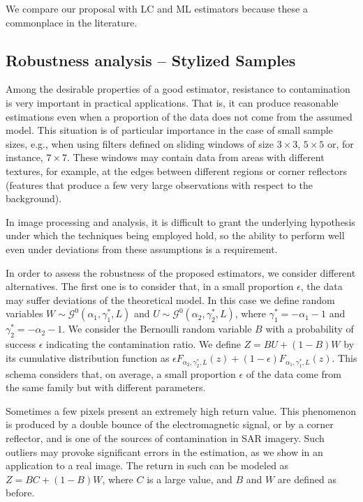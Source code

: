 \documentclass[twocolumn]{svjour3}
\begin{document}
We compare our proposal with LC and ML estimators because these a commonplace in the literature.

\subsection{Robustness analysis -- Stylized Samples}
\label{robustez}
Among the desirable properties of a good estimator, resistance to contamination is very important in practical applications. 
That is, it can produce reasonable estimations even when a proportion of the data does not come from the assumed model. 
This situation is of particular importance in the case of small sample sizes, e.g., when using filters defined on sliding windows of size $3 \times 3$, $5 \times 5$ or, for instance, $7 \times 7$. 
These windows may contain data from areas with different textures, for example, at the edges between different regions or corner reflectors (features that produce a few very large observations with respect to the background).

In image processing and analysis, it is difficult to grant the underlying hypothesis under which the techniques being employed hold, so the ability to perform well even under deviations from these assumptions is a requirement.

In order to assess the robustness of the proposed estimators, we consider different alternatives. 
The first one is to consider that, in a small proportion $\epsilon$, the data may suffer deviations of the theoretical model. 
In this case we define random variables $W \sim \mathcal{G}^0(\alpha_1,\gamma_1^*,L)$ and $U \sim \mathcal{G}^0(\alpha_2,\gamma_2^*,L)$, where $\gamma_1^*=-\alpha_1-1$ and  $\gamma_2^*=-\alpha_2-1$. 
We consider the Bernoulli random variable $B$ with a probability of success $\epsilon$ indicating the contamination ratio.   
We define $Z=BU+(1-B)W$ by its cumulative distribution function as
$
\epsilon {F}_{\alpha_2,\gamma_2^*,L}(z)+(1-\epsilon) {F}_{\alpha_1,\gamma_1^*,L}(z)
$.
This schema considers that, on average, a small proportion $\epsilon$ of the data come from the same family but with different parameters. 

Sometimes a few pixels present an extremely high return value. 
This phenomenon is produced by a double bounce of the electromagnetic signal, or by a corner reflector, and is one of the sources of contamination in SAR imagery. 
Such outliers may provoke significant errors in the estimation, as we show in an application to a real image. 
The return in such can be modeled as $Z=BC+(1-B)W$, where $C$ is a large value, and $B$ and $W$ are defined as before.
\end{document}
